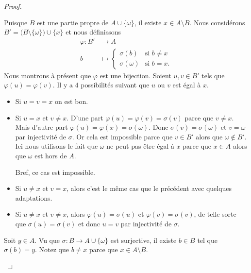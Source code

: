 \begin{proof}
\begin{subproof}
\begin{subproof}
			Puisque \( B\) est une partie propre de \( A\cup\{ \omega \}\), il existe \( x\in A\setminus B\). Nous considérons \( B'=\big( B\setminus\{ \omega \} \big)\cup\{ x \}\) et nous définissons
			\begin{equation}
				\begin{aligned}
					\varphi\colon B' & \to A                                       \\
					b                & \mapsto \begin{cases}
						                           \sigma(b)      & \text{si } b\neq x \\
						                           \sigma(\omega) & \text{si } b=x.
					                           \end{cases}
				\end{aligned}
			\end{equation}
			Nous montrons à présent que \( \varphi\) est une bijection.
			\spitem[Injectif]
			Soient \( u,v\in B'\) tels que \( \varphi(u)=\varphi(v)\). Il y a \( 4\) possibilités suivant que \( u\) ou \( v\) est égal à \( x\).
			\begin{itemize}

				\item
				      Si \( u=v=x\) on est bon.
				\item

				      Si \( u=x\) et \( v\neq x\). D'une part \( \varphi(u)=\varphi(v)=\sigma(v)\) parce que \( v\neq x\). Mais d'autre part \( \varphi(u)=\varphi(x)=\sigma(\omega)\). Donc \( \sigma(v)=\sigma(\omega)\) et \( v=\omega\) par injectivité de \( \sigma\). Or cela est impossible parce que \( v\in B'\) alors que \( \omega\not\in B'\). Ici nous utilisons le fait que \( \omega\) ne peut pas être égal à \( x\) parce que \( x\in A\) alors que \( \omega\) est hors de \( A\).

				      Bref, ce cas est impossible.
				\item
				      Si \( u\neq x\) et \( v=x\), alors c'est le même cas que le précédent avec quelques adaptations.
				\item
				      Si \( u\neq x\) et \( v\neq x\), alors \( \varphi(u)=\sigma(u)\) et \( \varphi(v)=\sigma(v)\), de telle sorte que \( \sigma(u)=\sigma(v)\) et donc \( u=v\) par injectivité de \( \sigma\).
			\end{itemize}
			\spitem[Surjective]
			Soit \( y\in A\). Vu que \( \sigma\colon B\to A\cup\{ \omega \}\) est surjective, il existe \( b\in B\) tel que \(\sigma(b)=y\). Notez que \( b\neq x\) parce que \( x\in A\setminus B\).


\end{subproof}
\end{subproof}
\end{proof}
